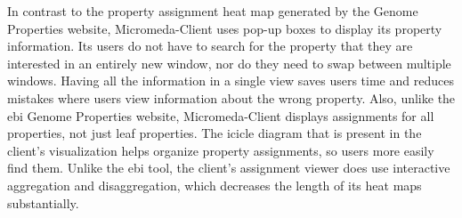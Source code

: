 In contrast to the property assignment heat map generated by the Genome 
Properties website, Micromeda-Client uses pop-up boxes to display its property 
information. Its users do not have to search for the property that they are 
interested in an entirely new window, nor do they need to swap between multiple 
windows. Having all the information in a single view saves users time and 
reduces mistakes where users view information about the wrong property. Also, 
unlike the \gls{ebi}  Genome Properties website, Micromeda-Client displays 
assignments for all properties, not just leaf properties. The icicle diagram 
that is present in the client's visualization helps organize property 
assignments, so users more easily find them. Unlike the \gls{ebi}  tool, the 
client's assignment viewer does use interactive aggregation and disaggregation, 
which decreases the length of its heat maps substantially.

